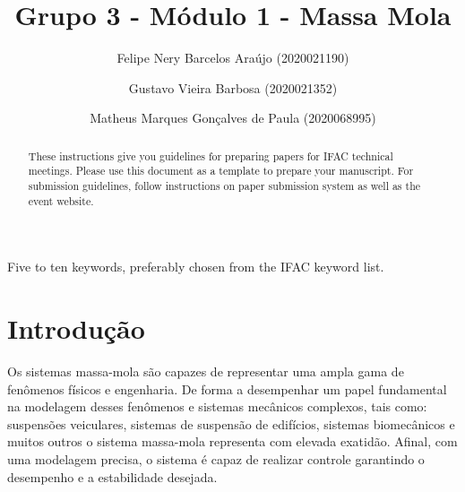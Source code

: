 \documentclass{ifacconf}
\begin{document}
\begin{frontmatter}

\title{Grupo 3 - Módulo 1 - Massa Mola} 


\author[First]{Felipe Nery Barcelos Araújo (2020021190)} 
\author[First]{Gustavo Vieira Barbosa (2020021352)} 
\author[First]{Matheus Marques Gonçalves de Paula (2020068995)}

\address[First]{
  Engenharia de Controle e Automação,\\ Universidade Federal de Minas Gerais, MG \\
   (e-mails: felipenery@ufmg.br, gustavovbarbosa@ufmg.br, mmgp@ufmg.br)
}

\begin{abstract}               
These instructions give you guidelines for preparing papers for IFAC
technical meetings. Please use this document as a template to prepare
your manuscript. For submission guidelines, follow instructions on
paper submission system as well as the event website.
\end{abstract}

\begin{keyword}
Five to ten keywords, preferably chosen from the IFAC keyword list.
\end{keyword}

\end{frontmatter}


\section{Introdução}

Os sistemas massa-mola são capazes de representar uma ampla gama de fenômenos
físicos e engenharia. De forma a desempenhar um papel fundamental na modelagem 
desses fenômenos e sistemas mecânicos complexos, tais como: suspensões veiculares, 
sistemas de suspensão de edifícios, sistemas biomecânicos e muitos outros o sistema 
massa-mola representa com elevada exatidão. Afinal, com uma modelagem precisa, o sistema
é capaz de realizar controle garantindo o desempenho e a estabilidade desejada.
\end{document}
